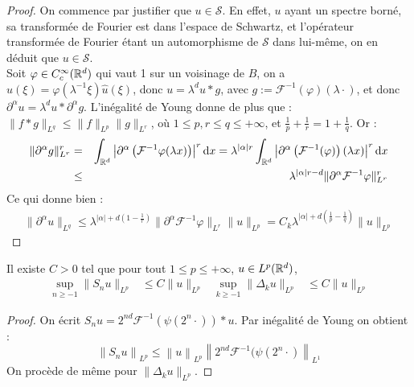 \documentclass[11pt,a4paper]{article}
\begin{document}
\begin{proof}
On commence par justifier que $u\in \mathcal{S}$. En effet, $u$ ayant un spectre borné, sa transformée de Fourier est dans l'espace de Schwartz, et l'opérateur transformée de Fourier étant un automorphisme de $\mathcal{S}$ dans lui-même, on en déduit que $u\in \mathcal{S}$. \\
Soit $\varphi \in C^\infty_c(\mathbb R^d)$ qui vaut 1 sur un voisinage de $B$, on a $\hat{u}(\xi)=\varphi(\lambda^{-1}\xi)\hat{u}(\xi)$, donc $u=\lambda^d u * g$, avec $g := \mathcal{F}^{-1}(\varphi)(\lambda \cdot)$, et donc $\partial^\alpha u =\lambda^d u * \partial^\alpha g$. L'inégalité de Young donne de plus que : $\|f * g \|_{L^q} \leq \|f\|_{L^p} \|g\|_{L^r}$, où $1\leq p,r\leq q \leq +\infty$, et $\frac{1}{p}+\frac{1}{r}= 1 + \frac{1}{q}$. Or :
\begin{eqnarray*}
\| \partial^\alpha g \|^r_{L^r} &=& \int_{\mathbb R^d} \left | \partial^\alpha \left(\mathcal{F}^{-1} \varphi(\lambda x)\right) \right |^r \mathrm{d}x =   \lambda^{|\alpha|r} \int_{\mathbb R^d} \left | \partial^\alpha \left(\mathcal{F}^{-1}(\varphi)\right)(\lambda x) \right |^r \mathrm{d}x  \\
&\leq& \lambda^{|\alpha|r-d} \| \partial^\alpha \mathcal{F}^{-1}\varphi \|^r_{L^r}
\end{eqnarray*}
Ce qui donne bien :
\begin{eqnarray*}
\| \partial^\alpha u \|_{L^q} \leq \lambda^{|\alpha| + d(1-\frac{1}{r})} \| \partial^\alpha \mathcal{F}^{-1}\varphi \|_{L^r} \|u\|_{L^p} = C_k\lambda^{|\alpha| + d(\frac{1}{p}-\frac{1}{q})} \|u\|_{L^p}
\end{eqnarray*}
\end{proof}


\begin{lemma}\label{young}
Il existe $C>0$ tel que pour tout $1\leq p \leq +\infty$, $u \in L^p(\mathbb R^d)$, 
\begin{align*}
\sup_{n\geq -1}\|S_nu\|_{L^p} &\leq C \|u\|_{L^p} & \sup_{k\geq -1}\|\Delta_ku\|_{L^p} &\leq C \|u\|_{L^p}
\end{align*}
\end{lemma}

\begin{proof}
On écrit $S_n u = 2^{nd} \mathcal{F}^{-1}(\psi(2^n\cdot))\ast u$. Par inégalité de Young on obtient :
$$\left\lVert S_n u \right\rVert_{L^p} \leq \left\lVert u \right\rVert_{L^p} \left\lVert 2^{nd} \mathcal{F}^{-1}(\psi(2^n\cdot)  \right\rVert_{L^1}$$ 
On procède de même pour $\|\Delta_k u\|_{L^p}$.
\end{proof}
\end{document}
